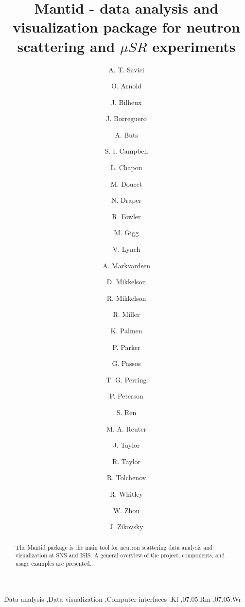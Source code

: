 \documentclass{elsarticle}
\begin{document}
\begin{frontmatter}



\title{Mantid - data analysis and visualization package for neutron scattering and $\mu SR$ experiments}


\author[ornl]{A. T. Savici}
\author[tessella]{O. Arnold}
\author[ornl]{J. Bilheux}
\author[ornl]{J. Borreguero}
\author[isis]{A. Buts}
\author[ornl]{S. I. Campbell}
\author[ill]{L. Chapon}
\author[ornl]{M. Doucet}
\author[tessella]{N. Draper}
\author[isis]{R. Fowler}
\author[tessella]{M. Gigg}
\author[ornl]{V. Lynch}
\author[isis]{A. Markvardsen}
\author[ornl,uws]{D. Mikkelson}
\author[ornl,uws]{R. Mikkelson}
\author[ornl]{R. Miller}
\author[isis]{K. Palmen}
\author[isis]{P. Parker}
\author[isis]{G. Passos}
\author[isis]{T. G. Perring}
\author[ornl]{P. Peterson}
\author[ornl]{S. Ren}
\author[ornl]{M. A. Reuter}
\author[isis]{J. Taylor}
\author[tessellaUS]{R. Taylor}
\author[tessella]{R. Tolchenov}
\author[isis]{R. Whitley}
\author[ornl]{W. Zhou}
\author[ornl]{J. Zikovsky}

\address[ornl]{Neutron Data Analysis and Visualization, Oak Ridge National Laboratory, Oak Ridge, TN, USA}
\address[tessella]{Tessella plc., Abingdon, Oxfordshire, UK}
\address[isis]{ISIS Facility, Rutherford Appleton Laboratory, Chilton, Didcot, Oxfordshire, UK}
\address[ill]{Institut Laue-Langevin, Grenoble, France}
\address[uws]{University of Wisconsin-Stout, Menomonie, WI, USA}
\address[tessella]{Tessella, US}

\begin{abstract}
The Mantid  package is the main tool for neutron scattering data analysis and visualization at SNS and ISIS. A general overview of the project, components, and usage examples are presented. 
\end{abstract}

\begin{keyword}
Data analysis \sep Data visualization \sep Computer interfaces
.Kf 	%
\sep 07.05.Rm 	%
\sep 07.05.Wr 	%
\end{keyword}
\end{frontmatter}
\end{document}
